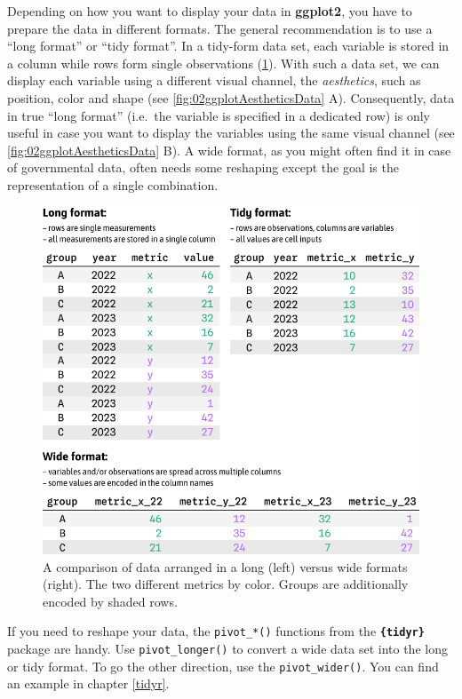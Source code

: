 \documentclass[
]{krantz}
\begin{document}
Depending on how you want to display your data in \textbf{ggplot2}, you have to prepare the data in different formats. The general recommendation is to use a ``long format'' or ``tidy format''. In a tidy-form data set, each variable is stored in a column while rows form single observations (\ref{fig:02imgFormatLongTidyWide}). With such a data set, we can display each variable using a different visual channel, the \emph{aesthetics}, such as position, color and shape (see \ref{fig:02ggplotAestheticsData} A). Consequently, data in true ``long format'' (i.e.~the variable is specified in a dedicated row) is only useful in case you want to display the variables using the same visual channel (see \ref{fig:02ggplotAestheticsData} B). A wide format, as you might often find it in case of governmental data, often needs some reshaping except the goal is the representation of a single combination.

\begin{figure}
\centering
\includegraphics{./img/table-format-long-tidy-wide.png}
\caption{\label{fig:02imgFormatLongTidyWide}A comparison of data arranged in a long (left) versus wide formats (right). The two different metrics by color. Groups are additionally encoded by shaded rows.}
\end{figure}

If you need to reshape your data, the \texttt{pivot\_*()} functions from the \textbf{\texttt{\{tidyr\}}} package are handy. Use \texttt{pivot\_longer()} to convert a wide data set into the long or tidy format. To go the other direction, use the \texttt{pivot\_wider()}. You can find an example in chapter \ref{tidyr}.
\end{document}
